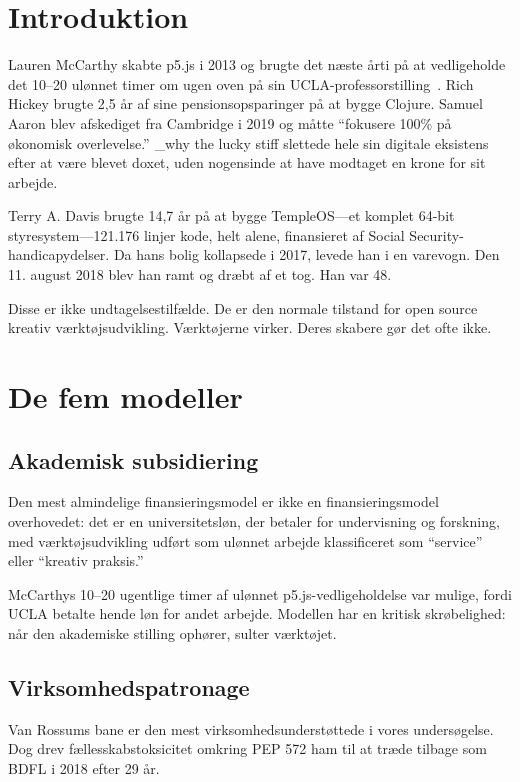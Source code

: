 \documentclass[10pt,letterpaper,twocolumn]{article}
\begin{document}
\section{Introduktion}

Lauren McCarthy skabte p5.js i 2013 og brugte det næste årti på at vedligeholde det 10--20 ulønnet timer om ugen oven på sin UCLA-professorstilling~\citep{mccarthy2023making}. Rich Hickey brugte 2,5 år af sine pensionsopsparinger på at bygge Clojure. Samuel Aaron blev afskediget fra Cambridge i 2019 og måtte ``fokusere 100\% på økonomisk overlevelse.'' \_why the lucky stiff slettede hele sin digitale eksistens efter at være blevet doxet, uden nogensinde at have modtaget en krone for sit arbejde.

Terry A. Davis brugte 14,7 år på at bygge TempleOS---et komplet 64-bit styresystem---121.176 linjer kode, helt alene, finansieret af Social Security-handicapydelser. Da hans bolig kollapsede i 2017, levede han i en varevogn. Den 11. august 2018 blev han ramt og dræbt af et tog. Han var 48.

Disse er ikke undtagelsestilfælde. De er den normale tilstand for open source kreativ værktøjsudvikling. Værktøjerne virker. Deres skabere gør det ofte ikke.

\section{De fem modeller}

\subsection{Akademisk subsidiering}

Den mest almindelige finansieringsmodel er ikke en finansieringsmodel overhovedet: det er en universitetsløn, der betaler for undervisning og forskning, med værktøjsudvikling udført som ulønnet arbejde klassificeret som ``service'' eller ``kreativ praksis.''

McCarthys 10--20 ugentlige timer af ulønnet p5.js-vedligeholdelse var mulige, fordi UCLA betalte hende løn for andet arbejde. Modellen har en kritisk skrøbelighed: når den akademiske stilling ophører, sulter værktøjet.

\subsection{Virksomhedspatronage}

Van Rossums bane er den mest virksomhedsunderstøttede i vores undersøgelse. Dog drev fællesskabstoksicitet omkring PEP 572 ham til at træde tilbage som BDFL i 2018 efter 29 år.
\end{document}
